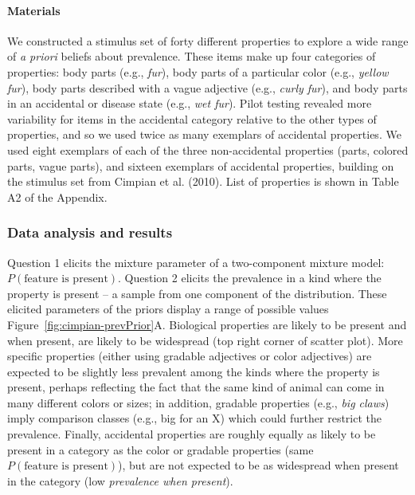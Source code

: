 \documentclass[floatsintext,doc]{apa6}
\let\oldparagraph\paragraph
\renewcommand{\paragraph}[1]{\oldparagraph{#1}\mbox{}}
\begin{document}
\paragraph{Materials}
We constructed a stimulus set of forty different properties to explore a
wide range of \emph{a priori} beliefs about prevalence. These items make
up four categories of properties: body parts (e.g., \emph{fur}), body
parts of a particular color (e.g., \emph{yellow fur}), body parts
described with a vague adjective (e.g., \emph{curly fur}), and body
parts in an accidental or disease state (e.g., \emph{wet fur}).
Pilot testing revealed more variability for items in the
accidental category relative to the other types of properties, and so we used
twice as many exemplars of accidental properties. We used eight exemplars of each of the three
non-accidental properties (parts, colored parts, vague parts), and
sixteen exemplars of accidental properties, building on the stimulus set
from Cimpian et al. (2010). List of properties is shown in Table A2 of
the Appendix.


\subsubsection{Data analysis and
results}\label{data-analysis-and-results}

Question 1 elicits the mixture parameter of a two-component mixture
model: \(P(\text{feature is present})\). Question 2 elicits the
prevalence in a kind where the property is present -- a sample from one component of the distribution. These elicited
parameters of the priors display a range of possible values
Figure~\ref{fig:cimpian-prevPrior}A. Biological properties are likely to
be present and when present, are likely to be widespread (top right
corner of scatter plot). More specific properties (either using gradable
adjectives or color adjectives) are expected to be slightly less
prevalent among the kinds where the property is present, perhaps
reflecting the fact that the same kind of animal can come in many
different colors or sizes; in addition, gradable properties (e.g., \emph{big claws}) imply comparison classes (e.g., big for an X) which could further restrict the prevalence. Finally, accidental properties
are roughly equally as likely to be present in a category as the color or gradable
properties (same \(P(\text{feature is present})\)), but are not expected
to be as widespread when present in the category (low \emph{prevalence
when present}).
\end{document}

